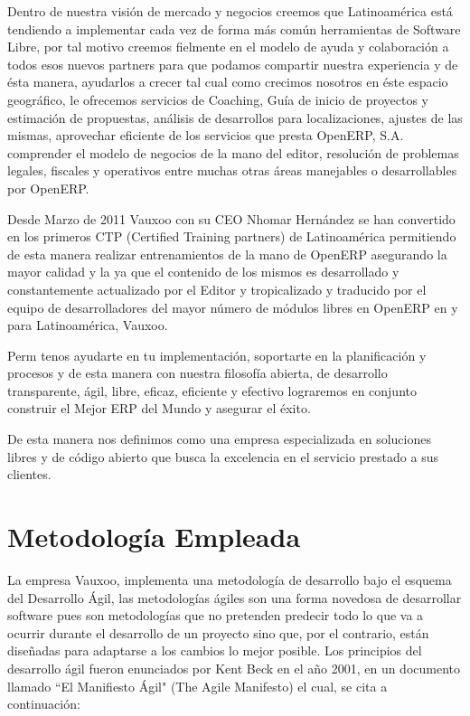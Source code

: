 \documentclass[a4paper, 12pt]{article}
\begin{document}
Dentro de nuestra visión de mercado y negocios creemos que Latinoamérica está tendiendo a implementar cada vez de forma más común herramientas de Software Libre, por tal motivo creemos fielmente en el modelo de ayuda y colaboración a todos esos nuevos partners para que podamos compartir nuestra experiencia y de ésta manera, ayudarlos a crecer tal cual como crecimos nosotros en éste espacio geográfico, le ofrecemos servicios de Coaching, Guía de inicio de proyectos y estimación de propuestas, análisis de desarrollos para localizaciones, ajustes de las mismas, aprovechar eficiente de los servicios que presta OpenERP, S.A. comprender el modelo de negocios de la mano del editor, resolución de problemas legales, fiscales y operativos entre muchas otras áreas manejables o desarrollables por OpenERP.

Desde Marzo de 2011 Vauxoo con su CEO Nhomar Hernández se han convertido en los primeros CTP (Certified Training partners) de Latinoamérica permitiendo de esta manera realizar entrenamientos de la mano de OpenERP asegurando la mayor calidad y la ya que el contenido de los mismos es desarrollado y constantemente actualizado por el Editor y tropicalizado y traducido por el equipo de desarrolladores del mayor número de módulos libres en OpenERP en y para Latinoamérica, Vauxoo.

Perm tenos ayudarte en tu implementación, soportarte en la planificación y procesos y de esta manera con nuestra filosofía abierta, de desarrollo transparente, ágil, libre, eficaz, eficiente y efectivo lograremos en conjunto construir el Mejor ERP del Mundo y asegurar el éxito.

De esta manera nos definimos como una empresa especializada en soluciones libres y de código abierto que busca la excelencia en el servicio prestado a sus clientes.

\newpage

\section{Metodología Empleada}
La empresa Vauxoo, implementa una metodología de desarrollo bajo el esquema del Desarrollo Ágil, las metodologías ágiles son una forma novedosa de desarrollar software pues son metodologías que no pretenden predecir todo lo que va a ocurrir durante el desarrollo de un proyecto sino que, por el contrario, están diseñadas para adaptarse a los cambios lo mejor posible. Los principios del desarrollo ágil fueron enunciados por Kent Beck en el año 2001, en un documento llamado ``El Manifiesto Ágil" (The Agile Manifesto) el cual, se cita a continuación:
\end{document}
